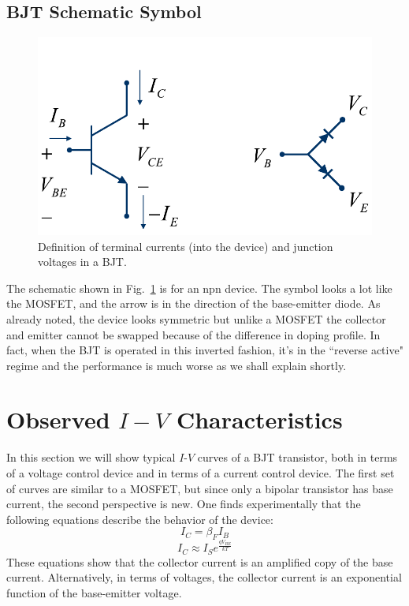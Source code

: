 \subsection{BJT Schematic Symbol}
\begin{figure}[tb]
\centering
\includegraphics[width=.6\columnwidth]{slide5_bjt_schematic}
\caption{Definition of terminal currents (into the device) and junction voltages in a BJT.} \label{fig:slide5_bjt_schematic}
\end{figure}
The schematic shown in Fig.~\ref{fig:slide5_bjt_schematic} is for an npn device.  The symbol looks a lot like the MOSFET, and the arrow is in the direction of the base-emitter diode.  As already noted, the device looks symmetric but unlike a MOSFET the collector and emitter cannot be swapped because of the difference in doping profile. In fact, when the BJT is operated in this inverted fashion, it's in the ``reverse active" regime and the performance is much worse as we shall explain shortly. 
\section{Observed \texorpdfstring{$I-V$}{I-V} Characteristics}
In this section we will show typical $I$-$V$ curves of a BJT transistor, both in terms of a voltage control device and in terms of a current control device.  The first set of curves are similar to a MOSFET, but since only a bipolar transistor has base current, the second perspective is new.  One finds experimentally that the following equations describe the behavior of the device:
    \begin{equation}
        {I_C} = \beta_F {I_B}
    \end{equation}
    \begin{equation}
        {I_C} \approx {I_S}{e^{\frac{{q{V_{BE}}}}{{kT}}}}
    \end{equation}
These equations show that the collector current is an amplified copy of the base current.  Alternatively, in terms of voltages, the collector current is an exponential function of the base-emitter voltage.
